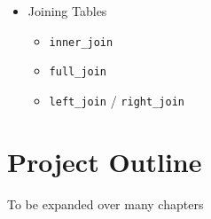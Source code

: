 \documentclass[
]{book}
\providecommand{\tightlist}{%
  \setlength{\itemsep}{0pt}\setlength{\parskip}{0pt}}
\begin{document}
\begin{itemize}
\tightlist
\item
  Joining Tables

  \begin{itemize}
  \tightlist
  \item
    \texttt{inner\_join}
  \item
    \texttt{full\_join}
  \item
    \texttt{left\_join} / \texttt{right\_join}
  \end{itemize}
\end{itemize}

\hypertarget{project-outline}{%
\chapter{Project Outline}\label{project-outline}}

To be expanded over many chapters
\end{document}
